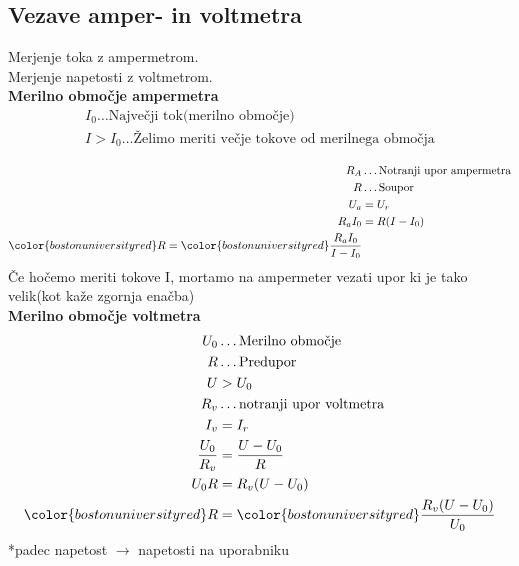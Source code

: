 {\color{indiagreen}\subsection{Vezave amper- in voltmetra}}
Merjenje toka z ampermetrom.\\
Merjenje napetosti z voltmetrom.\\
\textbf{Merilno območje ampermetra}\\
\begin{align*}
	I_0 \dots \text{Največji tok(merilno območje)}\\
	I > I_0 \dots \text{Želimo meriti večje tokove od merilnega območja}\\
\end{align*}
\begin{align*}
	R_A &\dots \text{Notranji upor ampermetra}\\
	R &\dots \text{Soupor}\\
	U_a &= U_r\\
	R_a I_0 &= R(I - I_0)\\
	{\color{bostonuniversityred}R} = {\color{bostonuniversityred}\frac{R_a I_0}{I - I_0}}\\
\end{align*}
Če hočemo meriti tokove I, mortamo na ampermeter vezati upor ki je tako velik(kot kaže zgornja enačba)\\
\textbf{Merilno območje voltmetra}\\
\begin{align*}
	U_0 &\dots \text{Merilno območje}\\
	R &\dots \text{Predupor}\\
	U &> U_0\\
	R_v &\dots \text{notranji upor voltmetra}\\
	I_v &= I_r\\
	\frac{U_0}{R_v} &= \frac{U - U_0}{R}\\
	U_0 R &= R_v(U - U_0)\\
	{\color{bostonuniversityred}R} &= {\color{bostonuniversityred}\frac{R_v(U - U_0)}{U_0}}\\
\end{align*}
*padec napetost $\rightarrow$ napetosti na uporabniku\\